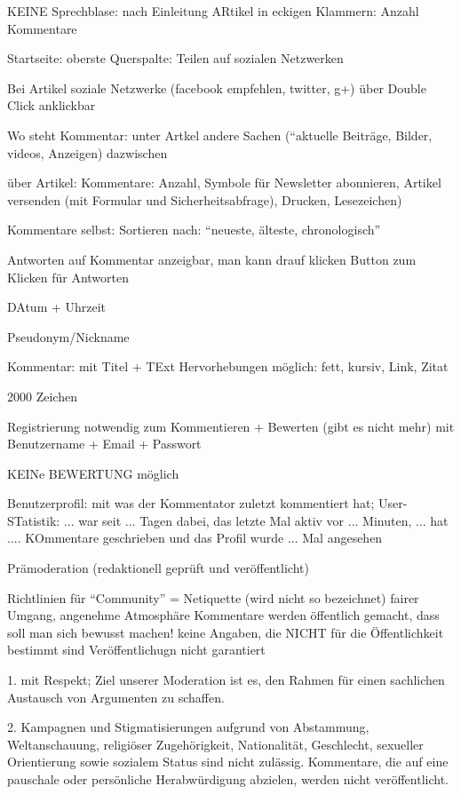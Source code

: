 KEINE Sprechblase: nach Einleitung ARtikel in eckigen Klammern: Anzahl Kommentare

Startseite: oberste Querspalte: Teilen auf sozialen Netzwerken

Bei Artikel soziale Netzwerke (facebook empfehlen, twitter, g+) über Double Click anklickbar

Wo steht Kommentar: unter Artkel andere Sachen (``aktuelle Beiträge, Bilder, videos, Anzeigen) dazwischen

über Artikel: Kommentare: Anzahl, Symbole für Newsletter abonnieren, Artikel versenden (mit Formular und Sicherheitsabfrage), Drucken, Lesezeichen)

Kommentare selbst: Sortieren nach: ``neueste, älteste, chronologisch''

Antworten auf Kommentar anzeigbar, man kann drauf klicken
Button zum Klicken für Antworten

DAtum + Uhrzeit

Pseudonym/Nickname

Kommentar: mit Titel + TExt
Hervorhebungen möglich: fett, kursiv, Link, Zitat

2000 Zeichen

Registrierung notwendig zum Kommentieren + Bewerten (gibt es nicht mehr) mit Benutzername + Email + Passwort

KEINe BEWERTUNG möglich

Benutzerprofil: mit was der Kommentator zuletzt kommentiert hat; User-STatistik: ... war seit ... Tagen dabei, das letzte Mal aktiv vor ... Minuten, ... hat .... KOmmentare geschrieben und das Profil wurde ... Mal angesehen



Prämoderation (redaktionell geprüft und veröffentlicht)

Richtlinien für ``Community'' = Netiquette (wird nicht so bezeichnet)
fairer Umgang, angenehme Atmosphäre
Kommentare werden öffentlich gemacht, dass soll man sich bewusst machen!
keine Angaben, die NICHT für die Öffentlichkeit bestimmt sind 
Veröffentlichugn nicht garantiert

1. mit Respekt; Ziel unserer Moderation ist es, den Rahmen für einen sachlichen Austausch von Argumenten zu schaffen.

2. Kampagnen und Stigmatisierungen aufgrund von Abstammung, Weltanschauung, religiöser Zugehörigkeit, Nationalität, Geschlecht, sexueller Orientierung sowie sozialem Status sind nicht zulässig. Kommentare, die auf eine pauschale oder persönliche Herabwürdigung abzielen, werden nicht veröffentlicht.

